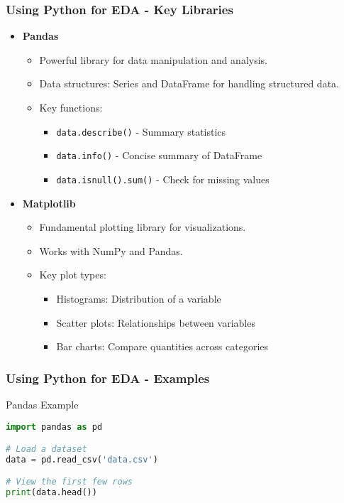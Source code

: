 \documentclass[aspectratio=169]{beamer}
\begin{document}
\begin{frame}[fragile]
    \frametitle{Using Python for EDA - Key Libraries}
    \begin{itemize}
        \item \textbf{Pandas}
        \begin{itemize}
            \item Powerful library for data manipulation and analysis.
            \item Data structures: Series and DataFrame for handling structured data.
            \item Key functions:
            \begin{itemize}
                \item \texttt{data.describe()} - Summary statistics
                \item \texttt{data.info()} - Concise summary of DataFrame
                \item \texttt{data.isnull().sum()} - Check for missing values
            \end{itemize}
        \end{itemize}
        
        \item \textbf{Matplotlib}
        \begin{itemize}
            \item Fundamental plotting library for visualizations.
            \item Works with NumPy and Pandas.
            \item Key plot types:
            \begin{itemize}
                \item Histograms: Distribution of a variable
                \item Scatter plots: Relationships between variables
                \item Bar charts: Compare quantities across categories
            \end{itemize}
        \end{itemize}
    \end{itemize}
\end{frame}

\begin{frame}[fragile]
    \frametitle{Using Python for EDA - Examples}
    \begin{block}{Pandas Example}
        \begin{lstlisting}[language=Python]
import pandas as pd

# Load a dataset
data = pd.read_csv('data.csv')

# View the first few rows
print(data.head())
        \end{lstlisting}
    \end{block}
\end{frame}
\end{document}
